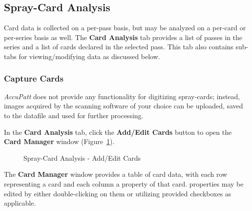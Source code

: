 \documentclass[10pt,letterpaper,titlepage]{article}
\begin{document}
    \subsection{Spray-Card Analysis}
    Card data is collected on a per-pass basis, but may be analyzed on a per-card or per-series basis as well. The \textbf{Card Analysis} tab provides a list of passes in the series and a list of cards declared in the selected pass. This tab also contains sub-tabs for viewing/modifying data as discussed below.

    \subsubsection{Capture Cards}
    \textit{AccuPatt} does not provide any functionality for digitizing spray-cards; instead, images acquired by the scanning software of your choice can be uploaded, saved to the datafile and used for further processing.\par
    In the \textbf{Card Analysis} tab, click the \textbf{Add/Edit Cards} button to open the \textbf{Card Manager} window (Figure~\ref{fig:card_manager}).\par 
    \begin{figure}[h]
        \centering
        \caption{Spray-Card Analysis - Add/Edit Cards}
        \label{fig:card_manager}
    \end{figure}
    The \textbf{Card Manager} window provides a table of card data, with each row representing a card and each column a property of that card. properties may be edited by either double-clicking on them or utilizing provided checkboxes as applicable.\par
\end{document}

